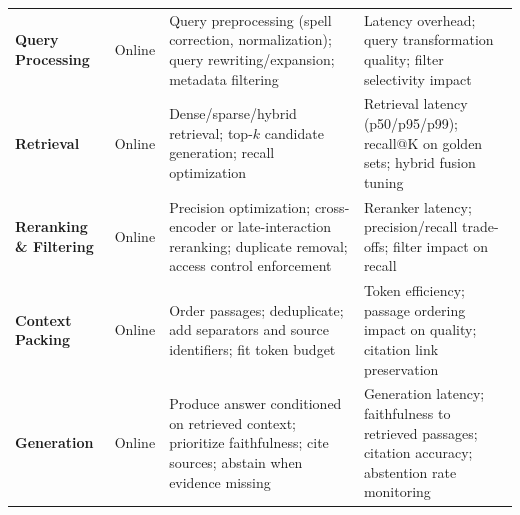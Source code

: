 {\begin{xltabular}{\linewidth}{@{}>{\raggedright\arraybackslash}p{2.8cm}>{\raggedright\arraybackslash}p{1.6cm}>{\raggedright\arraybackslash}X>{\raggedright\arraybackslash}X@{}}
\addlinespace[1pt]
\textbf{Query Processing} & Online & Query preprocessing (spell correction, normalization); query rewriting/expansion; metadata filtering & Latency overhead; query transformation quality; filter selectivity impact \\
\addlinespace[1pt]
\textbf{Retrieval} & Online & Dense/sparse/hybrid retrieval; top-$k$ candidate generation; recall optimization & Retrieval latency (p50/p95/p99); recall@K on golden sets; hybrid fusion tuning \\
\addlinespace[1pt]
\textbf{Reranking \& Filtering} & Online & Precision optimization; cross-encoder or late-interaction reranking; duplicate removal; access control enforcement & Reranker latency; precision/recall trade-offs; filter impact on recall \\
\addlinespace[1pt]
\textbf{Context Packing} & Online & Order passages; deduplicate; add separators and source identifiers; fit token budget & Token efficiency; passage ordering impact on quality; citation link preservation \\
\addlinespace[1pt]
\textbf{Generation} & Online & Produce answer conditioned on retrieved context; prioritize faithfulness; cite sources; abstain when evidence missing & Generation latency; faithfulness to retrieved passages; citation accuracy; abstention rate monitoring \\
\end{xltabular}
}

